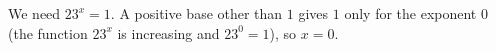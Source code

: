 We need $23^x=1$. A positive base other than $1$ gives $1$ only for the exponent $0$ (the function $23^x$ is increasing and $23^0=1$), so $x=\boxed{0}$.
